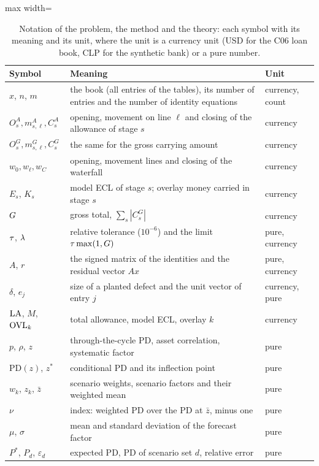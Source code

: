 \begin{table}[htbp]
\centering
\small
\caption{Notation of the problem, the method and the theory: each symbol with its meaning and its unit, where the unit is a currency unit (USD for the C06 loan book, CLP for the synthetic bank) or a pure number.}
\label{tab:notation}
\begin{adjustbox}{max width=\textwidth}\begin{tabular}{lll}
\toprule
Symbol & Meaning & Unit \\
\midrule
$x$, $n$, $m$ & the book (all entries of the tables), its number of entries and the number of identity equations & currency, count \\
$O^{A}_s, m^{A}_{s,\ell}, C^{A}_s$ & opening, movement on line $\ell$ and closing of the allowance of stage $s$ & currency \\
$O^{G}_s, m^{G}_{s,\ell}, C^{G}_s$ & the same for the gross carrying amount & currency \\
$w_0, w_\ell, w_C$ & opening, movement lines and closing of the waterfall & currency \\
$E_s$, $K_s$ & model ECL of stage $s$; overlay money carried in stage $s$ & currency \\
$G$ & gross total, $\sum_s |C^{G}_s|$ & currency \\
$\tau$, $\lambda$ & relative tolerance ($10^{-6}$) and the limit $\tau\max(1,G)$ & pure, currency \\
$A$, $r$ & the signed matrix of the identities and the residual vector $Ax$ & pure, currency \\
$\delta$, $e_j$ & size of a planted defect and the unit vector of entry $j$ & currency, pure \\
$\mathrm{LA}$, $M$, $\mathrm{OVL}_k$ & total allowance, model ECL, overlay $k$ & currency \\
$p$, $\rho$, $z$ & through-the-cycle PD, asset correlation, systematic factor & pure \\
$\mathrm{PD}(z)$, $z^{*}$ & conditional PD and its inflection point & pure \\
$w_k$, $z_k$, $\bar z$ & scenario weights, scenario factors and their weighted mean & pure \\
$\nu$ & index: weighted PD over the PD at $\bar z$, minus one & pure \\
$\mu$, $\sigma$ & mean and standard deviation of the forecast factor & pure \\
$P^{*}$, $P_d$, $\varepsilon_d$ & expected PD, PD of scenario set $d$, relative error & pure \\

\end{tabular}
\end{adjustbox}
\end{table}
